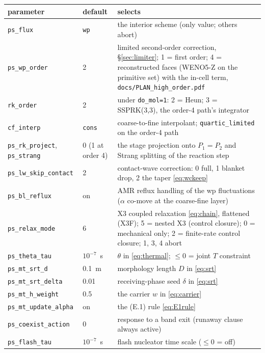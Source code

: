 \documentclass[11pt,a4paper]{article}
\newcommand{\code}[1]{\texttt{\small #1}}
\begin{document}
\begin{center}
\begin{tabular}{@{}ll>{\raggedright\arraybackslash}p{}@{}}
\toprule
parameter & default & selects \\
\midrule
\code{ps\_flux}              & \code{wp} & the interior scheme (only value; others abort) \\
\code{ps\_wp\_order}         & 2 & limited second-order correction, \S\ref{sec:limiter}; 1 = first order; 4 = reconstructed faces (WENO5-Z on the primitive set) with the in-cell term, \code{docs/PLAN\_high\_order.pdf} \\
\code{rk\_order}            & 2 & under \code{do\_mol=1}: 2 = Heun; 3 = SSPRK(3,3), the order-4 path's integrator \\
\code{cf\_interp}           & \code{cons} & coarse-to-fine interpolant; \code{quartic\_limited} on the order-4 path \\
\code{ps\_rk\_project}, \code{ps\_strang} & 0 (1 at order 4) & the stage projection onto $P_1=P_2$ and Strang splitting of the reaction step \\
\code{ps\_lw\_skip\_contact} & 2 & contact-wave correction: 0 full, 1 blanket drop, 2 the taper \eqref{eq:wckeep} \\
\code{ps\_bl\_reflux}        & on & AMR reflux handling of the wp fluctuations ($\alpha$ co-move at the coarse-fine layer) \\
\code{ps\_relax\_mode}       & 6 & X3 coupled relaxation \eqref{eq:chain}, flattened (X3F); 5 = nested X3 (control closure); 0 = mechanical only; 2 = finite-rate control closure; 1, 3, 4 abort \\
\code{ps\_theta\_tau}        & $10^{-7}$~s & $\theta$ in \eqref{eq:thermal}; $\le0$ = joint $T$ constraint \\
\code{ps\_mt\_srt\_d}        & 0.1~m & morphology length $D$ in \eqref{eq:srt} \\
\code{ps\_mt\_srt\_delta}    & 0.01 & receiving-phase seed $\delta$ in \eqref{eq:srt} \\
\code{ps\_mt\_h\_weight}     & 0.5 & the carrier $w$ in \eqref{eq:carrier} \\
\code{ps\_mt\_update\_alpha} & on  & the (E.1) rule \eqref{eq:E1rule} \\
\code{ps\_coexist\_action}   & 0 & response to a band exit (runaway clause always active) \\
\code{ps\_flash\_tau}        & $10^{-7}$~s & flash nucleator time scale ($\le0$ = off) \\

\end{tabular}
\end{center}
\end{document}
